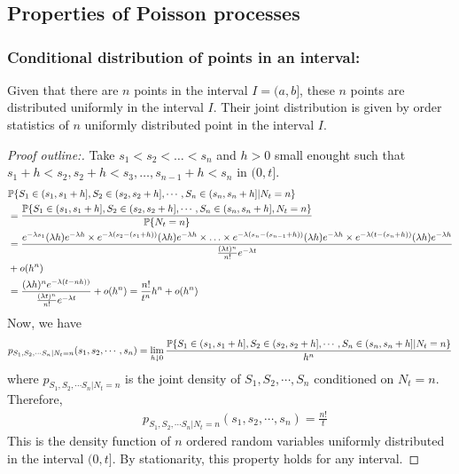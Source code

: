 \documentclass[all-lectures.tex]{subfiles}
\begin{document}
%
\setcounter{chapter}{1}
\setcounter{section}{2}

\section*{}
\chr
\setcounter{subsection}{1}
\subsection{Properties of Poisson processes}
\subsubsection*{Conditional distribution of points in an interval:} 
\begin{thm}
Given that there are $n$ points in the interval $I = (a,b]$, these $n$ points are distributed uniformly in the interval $I$. Their joint distribution is given by order statistics of $n$ uniformly distributed point in the interval $I$.
\end{thm}
\begin{proof}[Proof outline:]
{Take $s_1 < s_2 < \dots<s_n$ and $h>0$ small enought such that $s_1+h < s_2, s_2+h < s_3, \dots, s_{n-1}+h < s_n$ in $(0,t]$.
\begin{align*}
&\P\{S_1\in (s_1,s_1+h],S_2\in (s_2,s_2+h],\cdots,S_n\in (s_n,s_n+h] |N_t = n\}  \\
&= \frac{\P\{S_1\in (s_1,s_1+h],S_2\in (s_2,s_2+h],\cdots,S_n\in (s_n,s_n+h],N_t=n\}}{\P\{N_t=n\}}  \\
 &= \frac{ e^{-\lambda s_1} (\lambda h)e^{-\lambda h} \times e^{-\lambda (s_2-(s_1+h))}(\lambda h)e^{-\lambda h} \times \ldots \times e^{-\lambda (s_n-(s_{n-1}+h))} (\lambda h) e^{-\lambda h} \times e^{-\lambda (t-(s_n+h))} (\lambda h)  e^{-\lambda h} }{ \frac{(\lambda t)^n }{n!} e^{-\lambda t} } \\ &+ o(h^n)\\
 &= \frac{ (\lambda h)^n e^{-\lambda(t-nh))}}{ \frac{(\lambda t)^n }{n!} e^{-\lambda t} } + o(h^n) = \frac{n!}{t^n} h^n + o(h^n)
\end{align*}
Now, we have 
\begin{align*}
p_{S_1,S_2,\cdots S_n | N_t=n}(s_1,s_2,\cdots,s_n) &= \lim_{h \downarrow 0} \frac{\P\{S_1\in (s_1,s_1+h],S_2\in (s_2,s_2+h],\cdots,S_n\in (s_n,s_n+h] |N_t = n\}}{h^n} \\
\end{align*}
where $p_{S_1,S_2,\cdots S_n | N_t=n}$ is the joint density of $S_1,S_2,\cdots,S_n$ conditioned on $N_t=n$. Therefore, 
\begin{align*}
&p_{S_1,S_2,\cdots S_n | N_t=n}(s_1,s_2,\cdots,s_n) = \frac{n!}{t}
\end{align*}
}
This is the density function of $n$ ordered random variables uniformly distributed in the interval $(0,t]$. By stationarity, this property holds for any interval. \qedhere
\end{proof}
\end{document}
